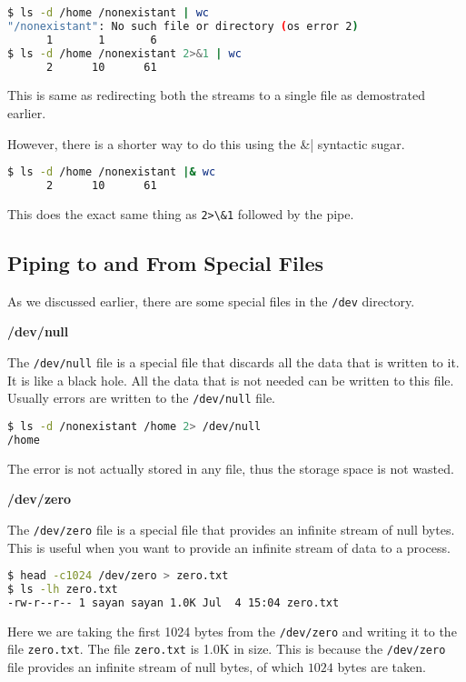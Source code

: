 \begin{lstlisting}[language=bash]
$ ls -d /home /nonexistant | wc
"/nonexistant": No such file or directory (os error 2)
      1       1       6
$ ls -d /home /nonexistant 2>&1 | wc
      2      10      61
\end{lstlisting}

This is same as redirecting both the streams to a single file as
demostrated earlier.

However, there is a shorter way to do this using the \lstinline||\&|
syntactic sugar.

\begin{lstlisting}[language=bash]
$ ls -d /home /nonexistant |& wc
      2      10      61
\end{lstlisting}

This does the exact same thing as \lstinline|2>\&1| followed by the pipe.

\subsection{Piping to and From Special Files}

As we discussed earlier, there are some special files in the \lstinline|/dev|
directory.

\textbf{/dev/null}

The \lstinline|/dev/null| file is a special file that discards all the data
that is written to it. It is like a black hole. All the data that is
not needed can be written to this file. Usually errors are written to
the \lstinline|/dev/null| file.

\begin{lstlisting}[language=bash]
$ ls -d /nonexistant /home 2> /dev/null
/home
\end{lstlisting}

The error is not actually stored in any file, thus the storage
space is not wasted.

\textbf{/dev/zero}

The \lstinline|/dev/zero| file is a special file that provides an infinite
stream of null bytes. This is useful when you want to provide an infinite
stream of data to a process.

\begin{lstlisting}[language=bash]
$ head -c1024 /dev/zero > zero.txt
$ ls -lh zero.txt
-rw-r--r-- 1 sayan sayan 1.0K Jul  4 15:04 zero.txt
\end{lstlisting}

Here we are taking the first 1024 bytes from the \lstinline|/dev/zero|
and writing it to the file \lstinline|zero.txt|. The file \lstinline|zero.txt|
is 1.0K in size. This is because the \lstinline|/dev/zero| file provides
an infinite stream of null bytes, of which $1024$ bytes are taken.

